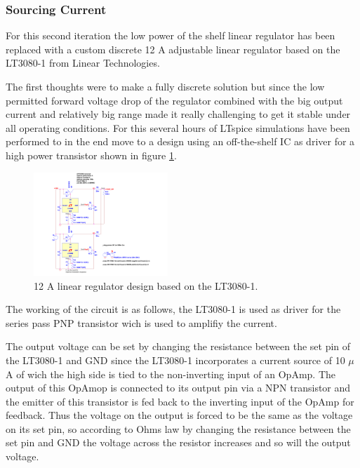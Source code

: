 \subsubsection{Sourcing Current}
For this second iteration the low power of the shelf linear regulator has been replaced with a custom discrete 12 A adjustable linear regulator based on the LT3080-1 from Linear Technologies.

The first thoughts were to make a fully discrete solution but since the low permitted forward voltage drop of the regulator combined with the big output current and relatively big range made it really challenging to get it stable 
under all operating conditions. For this several hours of LTspice simulations have been performed to in the end move to a design using an off-the-shelf IC as driver for a high power transistor shown in figure \ref{fig:LT3080-1_LinRegSchematic}.

\begin{figure}[h!]
    \centering
    \includegraphics[width=0.45\textwidth]{LT3080-1_LinRegSchematic.pdf}
    \caption{12 A linear regulator design based on the LT3080-1.}
    \label{fig:LT3080-1_LinRegSchematic}
\end{figure}

The working of the circuit is as follows, the LT3080-1 is used as driver for the series pass PNP transistor wich is used to amplifiy the current.

The output voltage can be set by changing the resistance between the set pin of the LT3080-1 and GND since the LT3080-1 incorporates a current source of 10 $\mu$A of wich the high side is tied to the non-inverting input of an OpAmp. The output of this OpAmop is connected to its output pin via a NPN transistor and the emitter of this transistor is fed back to the inverting input of the OpAmp for feedback. Thus the voltage on the output is forced to be the same as the voltage on its set pin, so according to Ohms law by changing the resistance between the set pin and GND the voltage across the resistor increases and so will the output voltage.

